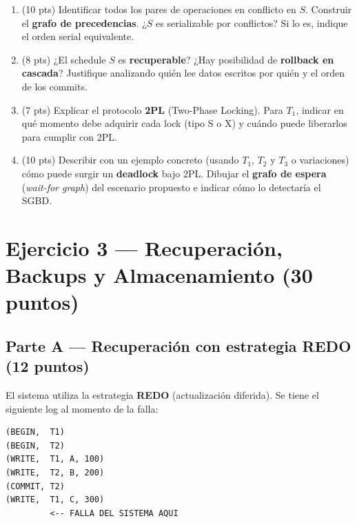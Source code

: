 \documentclass[11pt,a4paper]{article}
\begin{document}
\begin{enumerate}
  \item (10 pts) Identificar todos los pares de operaciones en conflicto en $S$. Construir el \textbf{grafo de precedencias}. ¿$S$ es serializable por conflictos? Si lo es, indique el orden serial equivalente.

  \vspace{6cm}

  \item (8 pts) ¿El schedule $S$ es \textbf{recuperable}? ¿Hay posibilidad de \textbf{rollback en cascada}? Justifique analizando quién lee datos escritos por quién y el orden de los commits.

  \vspace{4.5cm}

  \item (7 pts) Explicar el protocolo \textbf{2PL} (Two-Phase Locking). Para $T_1$, indicar en qué momento debe adquirir cada lock (tipo S o X) y cuándo puede liberarlos para cumplir con 2PL.

  \vspace{4.5cm}

  \item (10 pts) Describir con un ejemplo concreto (usando $T_1$, $T_2$ y $T_3$ o variaciones) cómo puede surgir un \textbf{deadlock} bajo 2PL. Dibujar el \textbf{grafo de espera} (\textit{wait-for graph}) del escenario propuesto e indicar cómo lo detectaría el SGBD.

  \vspace{5.5cm}
\end{enumerate}

\newpage

\section*{Ejercicio 3 — Recuperación, Backups y Almacenamiento \hfill\normalfont(30 puntos)}

\subsection*{Parte A — Recuperación con estrategia REDO (12 puntos)}

El sistema utiliza la estrategia \textbf{REDO} (actualización diferida). Se tiene el siguiente log al momento de la falla:

\begin{lstlisting}[style=log]
(BEGIN,  T1)
(BEGIN,  T2)
(WRITE,  T1, A, 100)
(WRITE,  T2, B, 200)
(COMMIT, T2)
(WRITE,  T1, C, 300)
         <-- FALLA DEL SISTEMA AQUI
\end{lstlisting}
\end{document}

